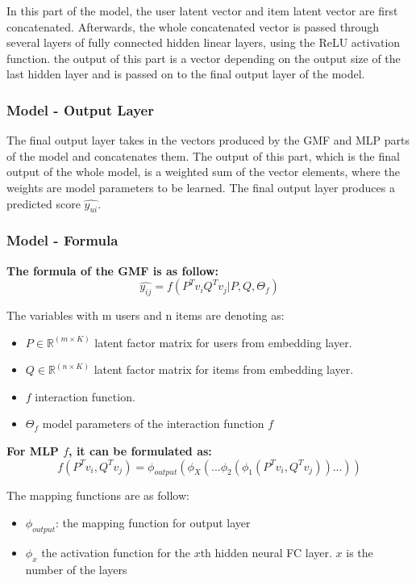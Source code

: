 \documentclass[final]{cvpr}
\begin{document}
In this part of the model, the user latent vector and item latent vector are first concatenated. Afterwards, the whole concatenated vector is passed through several layers of fully connected hidden linear layers, using the ReLU activation function. the output of this part is a vector depending on the output size of the last hidden layer and is passed on to the final output layer of the model.

\subsubsection{Model - Output Layer}

The final output layer takes in the vectors produced by the GMF and MLP parts of the model and concatenates them. The output of this part, which is the final output of the whole model, is a weighted sum of the vector elements, where the weights are model parameters to be learned. The final output layer produces a predicted score $\hat{y_{ui}}$.

\subsubsection{Model - Formula}
\bigskip
\textbf{ The formula of the GMF is as follow:}
$$\hat{y_{ij}} = f(P^T v_i Q^T v_j|P,Q,\Theta_f)$$

The variables with m users and n items are denoting as:
\begin{itemize}
    \item $P \in \mathbb{R}^{(m \times K)}$ latent factor matrix for users from embedding layer.
    \item $Q \in \mathbb{R} ^{(n \times K)}$ latent factor matrix for items from embedding layer.
    \item $f$ interaction function.    
    \item $\Theta_{f}$ model parameters of the interaction function $f$
\end{itemize}

\bigskip
\textbf{ For MLP $f$, it can be formulated as:}
$$f(P^T v_i, Q^T v_j) = \phi_{output}(\phi_X(...\phi_2(\phi_1(P^T v_i, Q^T v_j))...))$$

The mapping functions are as follow:
\begin{itemize}
    \item $\phi_{output}$: the mapping function for output layer
    \item $\phi_x$ the activation function for the $x$th hidden neural FC layer. $x$ is the number of the layers
\end{itemize}
\end{document}
